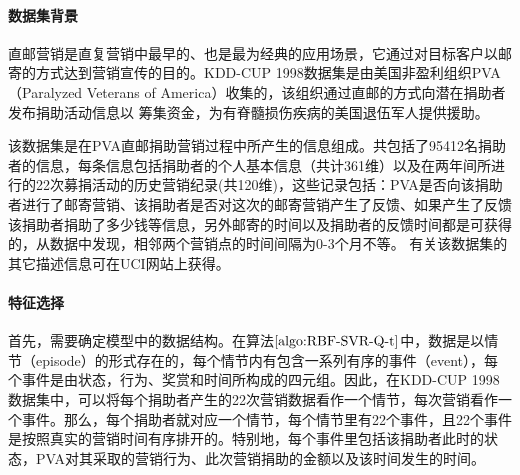 \paragraph{数据集背景}
直邮营销是直复营销中最早的、也是最为经典的应用场景，它通过对目标客户以邮寄的方式达到营销宣传的目的。KDD-CUP 1998数据集是由美国非盈利组织PVA（Paralyzed Veterans of America）收集的，该组织通过直邮的方式向潜在捐助者发布捐助活动信息以
筹集资金，为有脊髓损伤疾病的美国退伍军人提供援助。

该数据集是在PVA直邮捐助营销过程中所产生的信息组成。共包括了95412名捐助者的信息，每条信息包括捐助者的个人基本信息（共计361维）以及在两年间所进行的22次募捐活动的历史营销纪录(共120维)，这些记录包括：PVA是否向该捐助者进行了邮寄营销、该捐助者是否对这次的邮寄营销产生了反馈、如果产生了反馈该捐助者捐助了多少钱等信息，另外邮寄的时间以及捐助者的反馈时间都是可获得的，从数据中发现，相邻两个营销点的时间间隔为0-3个月不等。
有关该数据集的其它描述信息可在UCI网站上获得。

\paragraph{特征选择}
首先，需要确定模型中的数据结构。在算法$\ref{algo:RBF-SVR-Q-t}$中，数据是以情节（episode）的形式存在的，每个情节内有包含一系列有序的事件（event），每个事件是由状态，行为、奖赏和时间所构成的四元组。因此，在KDD-CUP 1998数据集中，可以将每个捐助者产生的22次营销数据看作一个情节，每次营销看作一个事件。那么，每个捐助者就对应一个情节，每个情节里有22个事件，且22个事件是按照真实的营销时间有序排开的。特别地，每个事件里包括该捐助者此时的状态，PVA对其采取的营销行为、此次营销捐助的金额以及该时间发生的时间。



